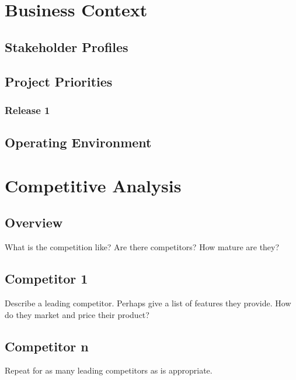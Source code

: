 \documentclass[12pt,oneside,letterpaper]{article}
\begin{document}
\section{Business Context}
\subsection{Stakeholder Profiles}
\subsection{Project Priorities}
\subsubsection{Release 1}
\subsection{Operating Environment}

\section{Competitive Analysis}
\subsection{Overview}
What is the competition like?  Are there competitors?  How mature are they?  
\subsection{Competitor 1}
Describe a leading competitor.  Perhaps give a list of features they provide.  How do they market and price their product?
\subsection{Competitor n}
Repeat for as many leading competitors as is appropriate.
\end{document}
